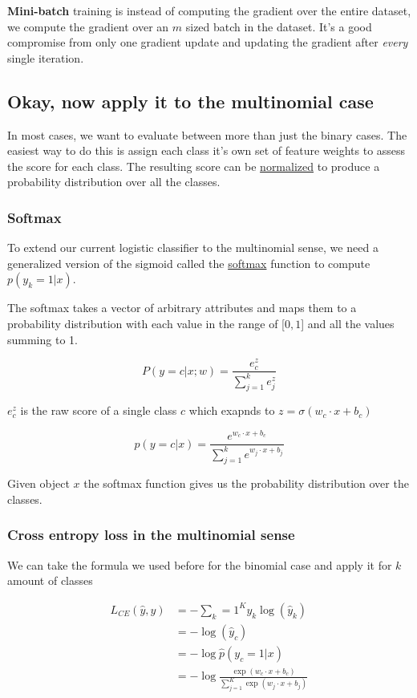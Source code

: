 \documentclass[11pt]{article}
\begin{document}
\textbf{Mini-batch} training is instead of computing the gradient over the
entire dataset, we compute the gradient over an $m$ sized batch in the dataset.
It's a good compromise from only one gradient update and updating the gradient
after \textit{every} single iteration.

\subsection{Okay, now apply it to the multinomial case}

In most cases, we want to evaluate between more than just the binary cases. The
easiest way to do this is assign each class it's own set of feature weights to
assess the score for each class. The resulting score can be \ul{normalized} to
produce a probability distribution over all the classes.

\subsubsection{Softmax}

To extend our current logistic classifier to the multinomial sense, we need a
generalized version of the sigmoid called the \ul{softmax} function to compute
$p(y_k=1|x)$.

The softmax takes a vector of arbitrary attributes and maps them to a
probability distribution with each value in the range of [$0, 1$] and all the
values summing to 1.

\[
	P(y=c|x;w) = \frac{e^z_c}{\sum_{j=1}^k e^z_j}
\]

$e^z_c$ is the raw score of a single class $c$ which exapnds to
$z = \sigma(w_c \cdot x + b_c)$


\[
	p(y=c|x) = \frac{e^{w_c \cdot x + b_c}}{\sum_{j=1}^k e^{w_j \cdot x + b_j}}
\]

Given object $x$ the softmax function gives us the probability distribution over
the classes.

\subsubsection{Cross entropy loss in the multinomial sense}

We can take the formula we used before for the binomial case and apply it for
$k$ amount of classes

\begin{align*}
	L_{CE}(\hat{y}, y) & = -\sum_k=1^K y_k\log(\hat{y}_k)                                             \\
	                   & = -\log(\hat{y}_c)                                                           \\
	                   & = -\log\hat{p}(y_c=1|x)                                                      \\
	                   & = -\log \frac{\exp(w_c \cdot x + b_c)}{\sum_{j=1}^K \exp(w_j \cdot x + b_j)}
\end{align*}
\end{document}
